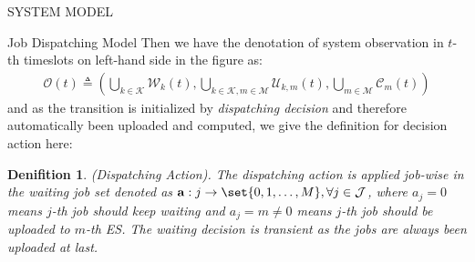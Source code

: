 \documentclass[10pt, conference, letterpaper]{IEEEtran}
\newtheorem{definition}{Denifition}
\newcommand{\eq}{=}
\renewcommand{\vec}{\mathbf}
\DeclarePairedDelimiter\set\{\}
\newcommand{\apSet}{\mathcal{K}}
\newcommand{\esSet}{\mathcal{M}}
\newcommand{\jSet}{\mathcal{J}}
\newcommand{\wSet}{\mathcal{W}}
\newcommand{\uSet}{\mathcal{U}}
\newcommand{\cSet}{\mathcal{C}}
\begin{document}
\begin{section}{SYSTEM MODEL}
\begin{subsection}{Job Dispatching Model}
            Then we have the denotation of system observation in $t$-th timeslots on left-hand side in the figure as:
            \begin{align}
                \mathcal{O}(t) \triangleq (\bigcup\limits_{k\in\apSet}\wSet_{k}(t), \bigcup\limits_{k\in\apSet, m\in\esSet}\uSet_{k,m}(t), \bigcup\limits_{m\in\esSet}\cSet_{m}(t))
            \end{align}
            and as the transition is initialized by \emph{dispatching decision} and therefore automatically been uploaded and computed, we give the definition for decision action here:
            \begin{definition}
                (Dispatching Action).
                The dispatching action is applied job-wise in the waiting job set denoted as $\vec{a}: j \to \set{0,1,\dots,M}, \forall j\in\jSet$, where $a_j\eq0$ means $j$-th job should keep waiting and $a_j=m\neq0$ means $j$-th job should be uploaded to $m$-th ES. The waiting decision is transient as the jobs are always been uploaded at last.
            \end{definition}


\end{subsection}
\end{section}
\end{document}
